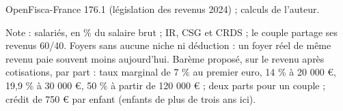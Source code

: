 OpenFisca-France 176.1 (législation des revenus 2024) ; calculs de l'auteur.\par Note : salariés, en \% du salaire brut ; IR, CSG et CRDS ; le couple partage ses revenus 60/40. Foyers sans aucune niche ni déduction : un foyer réel de même revenu paie souvent moins aujourd'hui. Barème proposé, sur le revenu après cotisations, par part : taux marginal de 7 \% au premier euro, 14 \% à 20 000 \euro{}, 19,9 \% à 30 000 \euro{}, 50 \% à partir de 120 000 \euro{} ; deux parts pour un couple ; crédit de 750 \euro{} par enfant (enfants de plus de trois ans ici).
